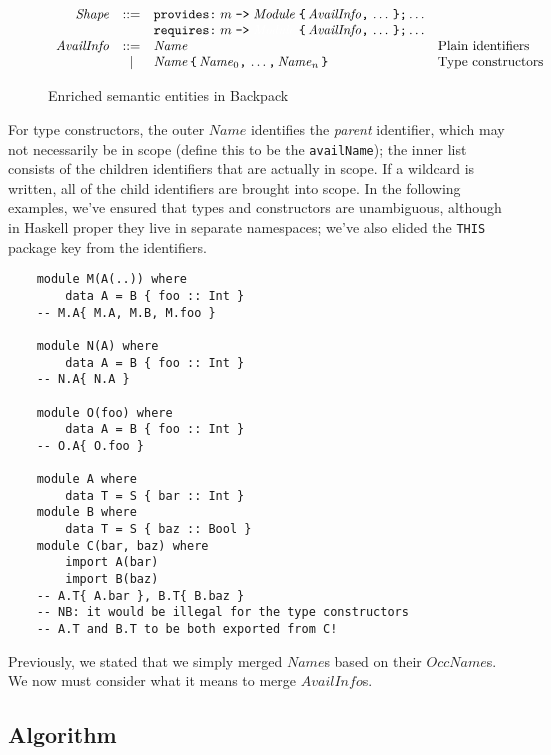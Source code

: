 \documentclass{article}
\newcommand{\I}[1]{\ensuremath{\mathit{#1}}}
\begin{document}
\begin{figure}[htpb]
$$
\begin{array}{rcll}
\I{Shape} & ::= & \verb|provides:|\; m \; \verb|->|\; \I{Module}\; \verb|{|\, \I{AvailInfo} \verb|,|\, \ldots \, \verb|};| \ldots \\
      &     & \verb|requires:| \; m \; \verb|->|\; \textcolor{white}{\I{Module}}\; \verb|{| \, \I{AvailInfo} \verb|,| \, \ldots \, \verb|}| \verb|;| \ldots \\
\I{AvailInfo} & ::= & \I{Name} & \mbox{Plain identifiers} \\
          & |   & \I{Name} \, \verb|{| \, \I{Name}_0\verb|,| \, \ldots\verb|,| \, \I{Name}_n \, \verb|}| & \mbox{Type constructors} \\
\end{array}
$$
\caption{Enriched semantic entities in Backpack} \label{fig:semantic2}
\end{figure}
%
For type constructors, the outer \I{Name} identifies the \emph{parent}
identifier, which may not necessarily be in scope (define this to be the \texttt{availName}); the inner list consists
of the children identifiers that are actually in scope.  If a wildcard
is written, all of the child identifiers are brought into scope.
In the following examples, we've ensured that
types and constructors are unambiguous, although in Haskell proper they
live in separate namespaces; we've also elided the \verb|THIS| package
key from the identifiers.

\begin{verbatim}
    module M(A(..)) where
        data A = B { foo :: Int }
    -- M.A{ M.A, M.B, M.foo }

    module N(A) where
        data A = B { foo :: Int }
    -- N.A{ N.A }

    module O(foo) where
        data A = B { foo :: Int }
    -- O.A{ O.foo }

    module A where
        data T = S { bar :: Int }
    module B where
        data T = S { baz :: Bool }
    module C(bar, baz) where
        import A(bar)
        import B(baz)
    -- A.T{ A.bar }, B.T{ B.baz }
    -- NB: it would be illegal for the type constructors
    -- A.T and B.T to be both exported from C!
\end{verbatim}
%
Previously, we stated that we simply merged \I{Name}s based on their
\I{OccName}s.  We now must consider what it means to merge \I{AvailInfo}s.

\subsection{Algorithm}
\end{document}
